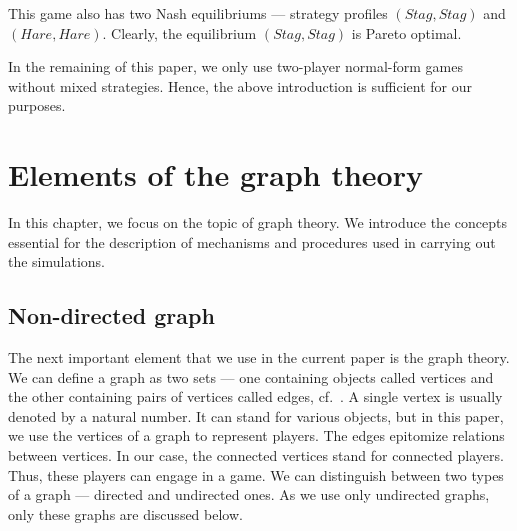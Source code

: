 \documentclass[english, twoside, 12pt, a4paper]{article}
\theoremstyle{definition}
\theoremstyle{plain}
\theoremstyle{remark}
\begin{document}
This game also has two Nash equilibriums --- strategy profiles \((Stag, Stag)\) and \((Hare, Hare)\). Clearly, the equilibrium \((Stag, Stag)\) is Pareto optimal. 

In the remaining of this paper, we only use two-player normal-form games without mixed strategies. Hence, the above introduction is sufficient for our purposes.

\clearpage
\section{Elements of the graph theory}

In this chapter, we focus on the topic of graph theory. We introduce the concepts essential for the description of mechanisms and procedures used in carrying out the simulations. 

\subsection{Non-directed graph}

The next important element that we use in the current paper is the graph theory. We can define a graph as two sets --- one containing objects called vertices and the other containing pairs of vertices called edges, cf.~\cite{ross1985discrete}. A single vertex is usually denoted by a natural number. It can stand for various objects, but in this paper, we use the vertices of a graph to represent players. The edges epitomize relations between vertices. In our case, the connected vertices stand for connected players. Thus, these players can engage in a game. We can distinguish between two types of a graph --- directed and undirected ones. As we use only undirected graphs, only these graphs are discussed below.
\end{document}
